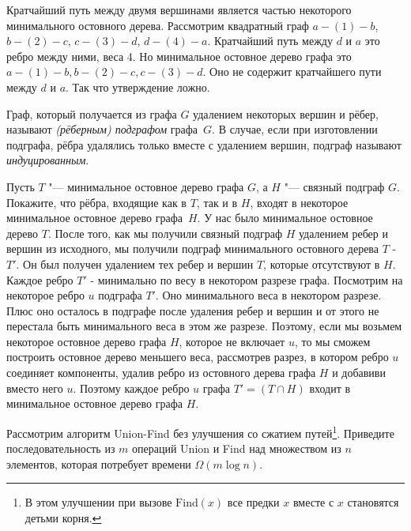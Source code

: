 \documentclass[12pt]{extreport}
\theoremstyle{definiton}
\theoremstyle{definition}
\theoremstyle{definition}
\newcounter{problem}
\newcounter{subrproblem}
\def\prsubr{\medskip\noindent\stepcounter{subrproblem}{\bf \asbuk{subrproblem})}\;}
\def\prend{
	\bigskip
}
\begin{document}
	\prsubr Кратчайший путь между двумя вершинами является частью некоторого минимального остовного дерева.
    \newline
    Рассмотрим квадратный граф $a-(1)-b$, $b-(2)-c$, $c-(3)-d$, $d-(4)-a$. Кратчайший путь между $d$ и $a$ это ребро между ними, веса 4. Но минимальное остовное дерево графа это $a-(1)-b,b-(2)-c, c-(3)-d$. Оно не содержит кратчайшего пути между $d$ и $a$. Так что утверждение ложно.

	\prend  
	
	 Граф, который получается из графа $G$ удалением некоторых вершин и рёбер, называют \emph{(рёберным) подграфом} графа~$G$. В случае, если при изготовлении подграфа, рёбра удалялись только вместе с удалением вершин, подграф называют \emph{индуцированным}.
	
	\medskip

	\Pr[4] Пусть $T$ "--- минимальное остовное дерево графа $G$, а $H$ "--- связный подграф $G$. Покажите, что рёбра, входящие как в $T$, так и в $H$, входят в некоторое минимальное остовное дерево графа~$H$.
    \newline
    У нас было минимальное остовное дерево $T$. После того, как мы получили связный подграф $H$ удалением ребер и вершин из исходного, мы получили подграф минимального остовного дерева $T$ - $T'$. Он был получен удалением тех ребер и вершин $T$, которые отсутствуют в $H$. Каждое ребро $T'$ - минимально по весу в некотором разрезе графа. Посмотрим на некоторое ребро $u$ подграфа $T'$. Оно минимального веса в некотором разрезе. Плюс оно осталось в подграфе после удаления ребер и вершин и от этого не перестала быть минимального веса в этом же разрезе. Поэтому, если мы возьмем некоторое остовное дерево графа $H$, которое не включает $u$, то мы сможем построить остовное дерево меньшего веса, рассмотрев разрез, в котором ребро $u$ соединяет компоненты, удалив ребро из остовного дерева графа $H$ и добавиви вместо него $u$. Поэтому каждое ребро $u$ графа $T'=(T \cap H)$ входит в минимальное остовное дерево графа $H$.
      
	\prend  


	\Pr[3] Рассмотрим алгоритм Union-Find без улучшения со сжатием путей\footnote{В этом улучшении при вызове $\mathrm{Find}(x)$ все предки $x$ вместе с $x$ становятся детьми корня.}. Приведите последовательность из $m$ операций Union и Find над множеством из $n$ элементов, которая потребует времени $\Omega(m\log n)$.

	\prend  
\end{document}
